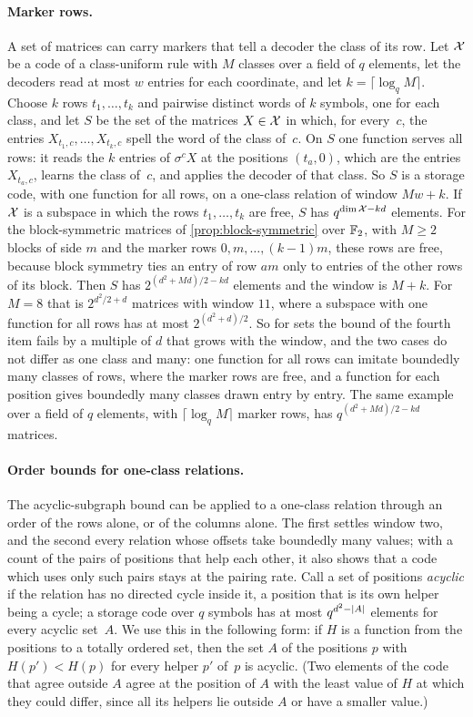 \paragraph{Marker rows.} A set of matrices can carry markers that tell a decoder the class of its row. Let $\mathcal{X}$ be a
code of a class-uniform rule with $M$ classes over a field of $q$ elements, let the decoders read at most $w$ entries
for each coordinate, and let $k=\lceil\log_qM\rceil$. Choose $k$ rows $t_1,\dots,t_k$ and pairwise distinct words
of $k$ symbols, one for each class, and let $S$ be the set of the matrices $X\in\mathcal{X}$ in which, for every~$c$, the entries
$X_{t_1,c},\dots,X_{t_k,c}$ spell the word of the class of~$c$. On $S$ one function serves all rows: it reads the $k$
entries of $\sigma^cX$ at the positions $(t_a,0)$, which are the entries $X_{t_a,c}$, learns the class of~$c$, and
applies the decoder of that class. So $S$ is a storage code, with one function for all rows, on a one-class relation
of window $Mw+k$. If $\mathcal{X}$ is a subspace in which the rows $t_1,\dots,t_k$ are free, $S$ has $q^{\dim\mathcal{X}-kd}$
elements. For the block-symmetric matrices of \cref{prop:block-symmetric} over $\mathbb{F}_2$, with $M\ge2$ blocks of side
$m$ and the marker rows $0,m,\dots,(k-1)m$, these rows are free, because block symmetry ties an entry of row $am$ only
to entries of the other rows of its block. Then $S$ has $2^{(d^2+Md)/2-kd}$ elements and the window is $M+k$. For
$M=8$ that is $2^{d^2/2+d}$ matrices with window $11$, where a subspace with one function for all rows has at most
$2^{(d^2+d)/2}$. So for sets the bound of the fourth item fails by a multiple of $d$ that grows with the window, and
the two cases do not differ as one class and many: one function for all rows can imitate boundedly many classes of
rows, where the marker rows are free, and a function for each position gives boundedly many classes drawn entry by
entry. The same example over a field of $q$ elements, with $\lceil\log_qM\rceil$ marker rows, has
$q^{(d^2+Md)/2-kd}$ matrices.

\paragraph{Order bounds for one-class relations.} The acyclic-subgraph bound can be applied to a one-class relation
through an order of the rows alone, or of the columns alone. The first settles window two, and the second every
relation whose offsets take boundedly many values; with a count of the pairs of positions that help each other, it
also shows that a code which uses only such pairs stays at the pairing rate. Call a set of positions \emph{acyclic}
if the relation has no directed cycle inside it, a position that is its own helper being a cycle; a storage code
over $q$ symbols has at most $q^{d^2-\lvert A \rvert}$ elements for every acyclic set~$A$. We use this in the following form:
if $H$ is a function from the positions to a totally ordered set, then the set $A$ of the positions $p$ with
$H(p')<H(p)$ for every helper $p'$ of~$p$ is acyclic. (Two elements of the code that agree outside $A$ agree at the
position of $A$ with the least value of $H$ at which they could differ, since all its helpers lie outside $A$ or
have a smaller value.)

